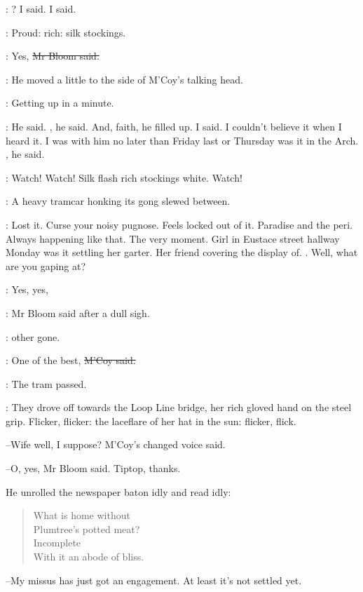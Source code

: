 \mccoy:
? I said.
 I said.


\BloomInt:
Proud:
rich:
silk stockings.

\Bloom:
Yes,
\sout{Mr Bloom said.}


:
He moved a little to the side of M'Coy's talking head.

\BloomInt:
Getting up in a minute.

\mccoy:
 He said.
, he said.
And, faith, he filled up.
 I said.
I couldn't believe it when I heard it.
I was with him no later than Friday last
or Thursday was it
in the Arch.
, he said.

\BloomInt:
Watch!
Watch!
Silk flash rich stockings white.
Watch!

:
A heavy tramcar honking its gong
slewed between.

\BloomInt:
Lost it.
Curse your noisy pugnose.
Feels locked out of it.
Paradise and the peri.
Always happening like that.
The very moment.
Girl in Eustace street hallway
Monday was it
settling her garter.
Her friend covering the display of.
.
Well, what are you gaping at?

\Bloom:
Yes, yes,

:
Mr Bloom said after a dull sigh.

\Bloom:
other gone.

\mccoy:
One of the best,
\sout{M'Coy said.}

:
The tram passed.

:
They drove off towards the Loop Line bridge,
her rich gloved hand on the steel grip.
Flicker, flicker:
the laceflare of her hat in the sun:
flicker, flick.

--Wife well, I suppose?
M'Coy's changed voice said.

--O, yes,
Mr Bloom said.
Tiptop, thanks.

He unrolled the newspaper baton idly and read idly:


\begin{verse}
    What is home without \\
    Plumtree's potted meat? \\
    Incomplete \\
    With it an abode of bliss.
\end{verse}


--My missus has just got an engagement.
At least it's not settled yet.

